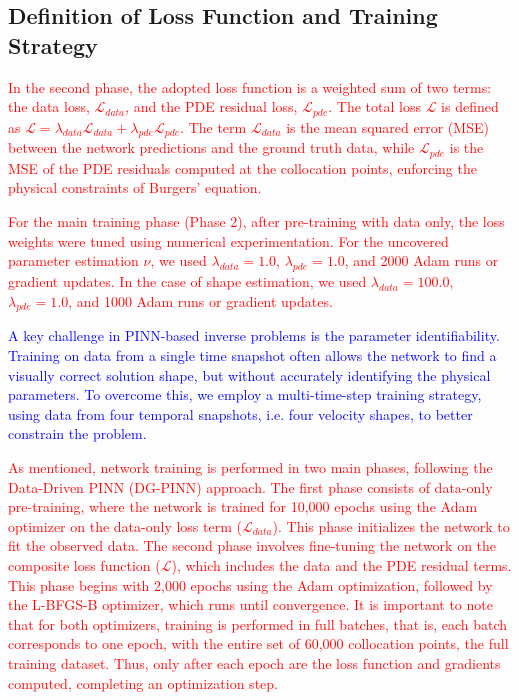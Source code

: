 \documentclass[12pt,fleqn]{article}
\begin{document}
\subsection{Definition of Loss Function and Training Strategy}

\textcolor{red}{In the second phase, the adopted loss function is a weighted sum of two terms: the data loss, $\mathcal{L}_{data}$, and the PDE residual loss, $\mathcal{L}_{pde}$. The total loss $\mathcal{L}$ is defined as $\mathcal{L} = \lambda_{data} \mathcal{L}_{data} + \lambda_{pde} \mathcal{L}_{pde}$. The term $\mathcal{L}_{data}$ is the mean squared error (MSE) between the network predictions and the ground truth data, while $\mathcal{L}_{pde}$ is the MSE of the PDE residuals computed at the collocation points, enforcing the physical constraints of Burgers' equation.}

\textcolor{red}{For the main training phase (Phase 2), after pre-training with data only, the loss weights were tuned using numerical experimentation. For the uncovered parameter estimation $\nu$, we used $\lambda_{data}=1.0$, $\lambda_{pde}=1.0$, and 2000 Adam runs or gradient updates. In the case of shape estimation, we used $\lambda_{data}=100.0$, $\lambda_{pde}=1.0$, and 1000 Adam runs or gradient updates.}



\textcolor{blue}{A key challenge in PINN-based inverse problems is the parameter identifiability. Training on data from a single time snapshot often allows the network to find a visually correct solution shape, but without accurately identifying the physical parameters. To overcome this, we employ a multi-time-step training strategy, using data from four temporal snapshots, i.e. four velocity shapes, to better constrain the problem.}


\textcolor{red}{As mentioned, network training is performed in two main phases, following the Data-Driven PINN (DG-PINN) approach. The first phase consists of data-only pre-training, where the network is trained for 10,000 epochs using the Adam optimizer on the data-only loss term ($\mathcal{L}_{data}$). This phase initializes the network to fit the observed data. The second phase involves fine-tuning the network on the composite loss function ($\mathcal{L}$), which includes the data and the PDE residual terms. This phase begins with 2,000 epochs using the Adam optimization, followed by the L-BFGS-B optimizer, which runs until convergence. It is important to note that for both optimizers, training is performed in full batches, that is, each batch corresponds to one epoch, with the entire set of 60,000 collocation points, the full training dataset. Thus, only after each epoch are the loss function and gradients computed, completing an optimization step.}
\end{document}
